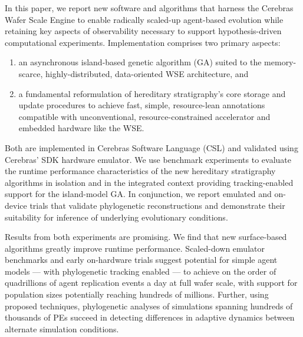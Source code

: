 In this paper, we report new software and algorithms that harness the Cerebras Wafer Scale Engine to enable radically scaled-up agent-based evolution while retaining key aspects of observability necessary to support hypothesis-driven computational experiments.
Implementation comprises two primary aspects:
\begin{enumerate}
  \item an asynchronous island-based genetic algorithm (GA) suited to the memory-scarce, highly-distributed, data-oriented WSE architecture, and
  \item a fundamental reformulation of hereditary stratigraphy's core storage and update procedures to achieve fast, simple, resource-lean annotations compatible with unconventional, resource-constrained accelerator and embedded hardware like the WSE.
\end{enumerate}

Both are implemented in Cerebras Software Language (CSL) and validated using Cerebras' SDK hardware emulator.
We use benchmark experiments to evaluate the runtime performance characteristics of the new hereditary stratigraphy algorithms in isolation and in the integrated context providing tracking-enabled support for the island-model GA.
In conjunction, we report emulated and on-device trials that validate phylogenetic reconstructions and demonstrate their suitability for inference of underlying evolutionary conditions.

Results from both experiments are promising.
We find that new surface-based algorithms greatly improve runtime performance.
Scaled-down emulator benchmarks and early on-hardware trials suggest potential for simple agent models --- with phylogenetic tracking enabled --- to achieve on the order of quadrillions of agent replication events a day at full wafer scale, with support for population sizes potentially reaching hundreds of millions.
Further, using proposed techniques, phylogenetic analyses of simulations spanning hundreds of thousands of PEs succeed in detecting differences in adaptive dynamics between alternate simulation conditions.
